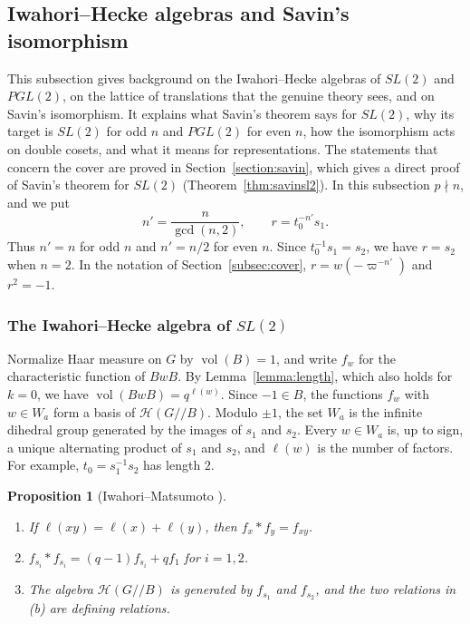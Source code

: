 \documentclass[12pt,letterpaper]{amsart}
\numberwithin{equation}{section}
\newtheorem{proposition}[theorem]{Proposition}
\theoremstyle{definition}
\theoremstyle{remark}
\DeclareMathOperator{\vol}{vol}
\newcommand{\cH}{\mathcal{H}}
\begin{document}
\subsection{Iwahori--Hecke algebras and Savin's isomorphism}
\label{subsec:savinbg}
This subsection gives background on the Iwahori--Hecke algebras of
$SL(2)$ and $PGL(2)$, on the lattice of translations that the genuine
theory sees, and on Savin's isomorphism. It explains what Savin's
theorem says for $SL(2)$, why its target is $SL(2)$ for odd $n$ and
$PGL(2)$ for even $n$, how the isomorphism acts on double cosets, and
what it means for representations. The statements that concern the
cover are proved in Section~\ref{section:savin}, which gives a direct
proof of Savin's theorem for $SL(2)$ (Theorem~\ref{thm:savinsl2}). In
this subsection $p\nmid n$, and we put
\begin{equation}
\label{eq:nprime}
n'=\frac{n}{\gcd(n,2)},\qquad r=t_0^{-n'}s_1 .
\end{equation}
Thus $n'=n$ for odd $n$ and $n'=n/2$ for even $n$. Since
$t_0^{-1}s_1=s_2$, we have $r=s_2$ when $n=2$. In the notation of
Section~\ref{subsec:cover}, $r=w(-\varpi^{-n'})$ and $r^2=-1$.

\subsubsection{The Iwahori--Hecke algebra of \texorpdfstring{$SL(2)$}{SL(2)}}
Normalize Haar measure on $G$ by $\vol(B)=1$, and write $f_w$ for the
characteristic function of $BwB$. By Lemma~\ref{lemma:length}, which
also holds for $k=0$, we have $\vol(BwB)=q^{\ell(w)}$. Since $-1\in B$,
the functions $f_w$ with $w\in W_a$ form a basis of $\cH(G/\!/B)$.
Modulo $\pm 1$, the set $W_a$ is the infinite dihedral group generated
by the images of $s_1$ and $s_2$. Every $w\in W_a$ is, up to sign, a
unique alternating product of $s_1$ and $s_2$, and $\ell(w)$ is the
number of factors. For example, $t_0=s_1^{-1}s_2$ has length $2$.

\begin{proposition}[Iwahori--Matsumoto {\cite[\S3]{IM65}}]
\label{prop:IM}
\begin{enumerate}[leftmargin=2em,label=(\alph*)]
\item If $\ell(xy)=\ell(x)+\ell(y)$, then $f_x*f_y=f_{xy}$.
\item $f_{s_i}*f_{s_i}=(q-1)f_{s_i}+qf_1$ for $i=1,2$.
\item The algebra $\cH(G/\!/B)$ is generated by $f_{s_1}$ and
$f_{s_2}$, and the two relations in (b) are defining relations.
\end{enumerate}
\end{proposition}
\end{document}
